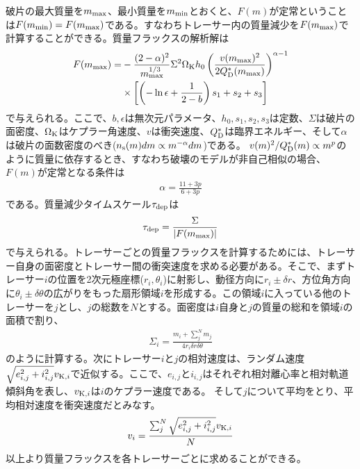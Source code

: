 \documentclass[a4paper,10pt,oneside,twocolumn,notitlepage,final]{jarticle}
\begin{document}
破片の最大質量を$m_{\rm max}$、最小質量を$m_{\rm min}$とおくと、$F(m)$が定常ということは$F(m_{\rm min}) = F(m_{\rm max})$である。すなわちトレーサー内の質量減少を$F(m_{\rm max})$で計算することができる。質量フラックスの解析解は
\begin{align}
 F(m_{\rm max}) =& - \frac{(2 - \alpha)^2}{m_{\rm max}^{1/3}} \Sigma^2 \Omega_{\rm K} h_0 \left( \frac{v(m_{\rm max})^2}{2 Q_{\rm D}^{\ast}(m_{\rm max})} \right)^{\alpha - 1} \nonumber \\
 &\times \left[ \left( - \ln \epsilon + \frac{1}{2 - b} \right) s_1 + s_2 + s_3 \right]
\end{align}
で与えられる。ここで、$b,\epsilon$は無次元パラメータ、$h_0,s_1,s_2,s_3$は定数、$\Sigma$は破片の面密度、$\Omega_{\rm K}$はケプラー角速度、$v$は衝突速度、$Q_{\rm D}^{\ast}$は臨界エネルギー、そして$\alpha$は破片の面数密度のべき($n_{\rm s} (m) dm \propto m^{- \alpha} dm$)である。
$v(m)^2/Q_{\rm D}^{\ast}(m) \propto m^p$のように質量に依存するとき、すなわち破壊のモデルが非自己相似の場合、$F(m)$が定常となる条件は
\begin{align}
 \alpha = \frac{11 + 3p}{6 + 3p}
\end{align}
である。質量減少タイムスケール$\tau_{\rm dep}$は
\begin{align}
 \tau_{\rm dep} = \frac{\Sigma}{|F(m_{\rm max})|}
\end{align}
で与えられる。トレーサーごとの質量フラックスを計算するためには、トレーサー自身の面密度とトレーサー間の衝突速度を求める必要がある。そこで、まずトレーサー$i$の位置を2次元極座標($r_i,\theta_i$)に射影し、動径方向に$r_i \pm \delta r$、方位角方向に$\theta_i \pm \delta \theta$の広がりをもった扇形領域$i$を形成する。この領域$i$に入っている他のトレーサーを$j$とし、$j$の総数を$N$とする。面密度は$i$自身と$j$の質量の総和を領域$i$の面積で割り、
\begin{align}
 \Sigma_i = \frac{m_i + \sum_{j}^{N} m_j}{4 r_i \delta r \delta \theta}
\end{align}
のように計算する。次にトレーサー$i$と$j$の相対速度は、ランダム速度$\sqrt{e_{i,j}^2 + i_{i,j}^2} v_{{\rm K},i}$で近似する。ここで、$e_{i,j}$と$i_{i,j}$はそれぞれ相対離心率と相対軌道傾斜角を表し、$v_{{\rm K},i}$は$i$のケプラー速度である。
そして$j$について平均をとり、平均相対速度を衝突速度だとみなす。
\begin{align}
 v_i = \frac{\sum_{j}^{N} \sqrt{e_{i,j}^2+i_{i,j}^2} v_{{\rm K},i}}{N}
\end{align}
以上より質量フラックスを各トレーサーごとに求めることができる。
\end{document}
